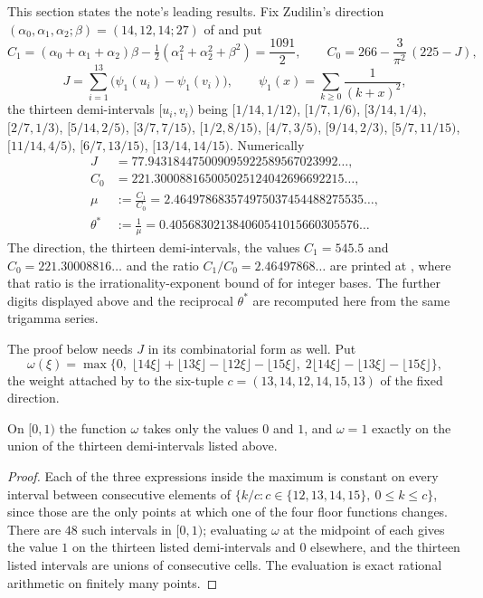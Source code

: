 This section states the note's leading results.  Fix Zudilin's direction
$(\alpha_0,\alpha_1,\alpha_2;\beta)=(14,12,14;27)$ of
\cite[Sec.~5]{zudilin2004} and put
\[
 C_1=(\alpha_0+\alpha_1+\alpha_2)\beta-\tfrac12(\alpha_1^{2}+\alpha_2^{2}+\beta^{2})
 =\frac{1091}{2},
 \qquad
 C_0=266-\frac{3}{\pi^{2}}\,(225-J),
\]
\[
 J=\sum_{i=1}^{13}\bigl(\psi_1(u_i)-\psi_1(v_i)\bigr),
 \qquad
 \psi_1(x)=\sum_{k\ge0}\frac1{(k+x)^{2}},
\]
the thirteen demi-intervals $[u_i,v_i)$ being
$[1/14,1/12)$, $[1/7,1/6)$, $[3/14,1/4)$, $[2/7,1/3)$, $[5/14,2/5)$,
$[3/7,7/15)$, $[1/2,8/15)$, $[4/7,3/5)$, $[9/14,2/3)$, $[5/7,11/15)$,
$[11/14,4/5)$, $[6/7,13/15)$, $[13/14,14/15)$.  Numerically
\begin{align*}
 J&=77.943184475009095922589567023992\ldots,\\
 C_0&=221.300088165005025124042696692215\ldots,\\
 \mu&:=\frac{C_1}{C_0}=2.464978683574975037454488275535\ldots,\\
 \theta^{*}&:=\frac1\mu=0.405683021384060541015660305576\ldots
\end{align*}
The direction, the thirteen demi-intervals, the values $C_1=545.5$ and
$C_0=221.30008816\ldots$ and the ratio $C_1/C_0=2.46497868\ldots$ are printed at
\cite[p.~162]{zudilin2004}, where that ratio is the irrationality-exponent bound
of \cite[Thm.~1, p.~154]{zudilin2004} for integer bases.  The further digits
displayed above and the reciprocal $\theta^{*}$ are recomputed here from the
same trigamma series.

The proof below needs $J$ in its combinatorial form as well.  Put
\[
 \omega(\xi)=\max\bigl\{0,\;
 \lfloor14\xi\rfloor+\lfloor13\xi\rfloor-\lfloor12\xi\rfloor-\lfloor15\xi\rfloor,\;
 2\lfloor14\xi\rfloor-\lfloor13\xi\rfloor-\lfloor15\xi\rfloor\bigr\},
\]
the weight attached by \cite[(26)]{zudilin2004} to the six-tuple
$c=(13,14,12,14,15,13)$ of the fixed direction.

\begin{lemma}\label{long1049:res:omega-indicator}
On $[0,1)$ the function $\omega$ takes only the values $0$ and $1$, and
$\omega=1$ exactly on the union of the thirteen demi-intervals listed above.
\end{lemma}

\begin{proof}
Each of the three expressions inside the maximum is constant on every interval
between consecutive elements of
$\{k/c: c\in\{12,13,14,15\},\ 0\le k\le c\}$, since those are the only points at
which one of the four floor functions changes.  There are $48$ such intervals in
$[0,1)$; evaluating $\omega$ at the midpoint of each gives the value $1$ on the
thirteen listed demi-intervals and $0$ elsewhere, and the thirteen listed
intervals are unions of consecutive cells.  The evaluation is exact rational
arithmetic on finitely many points.
\end{proof}

